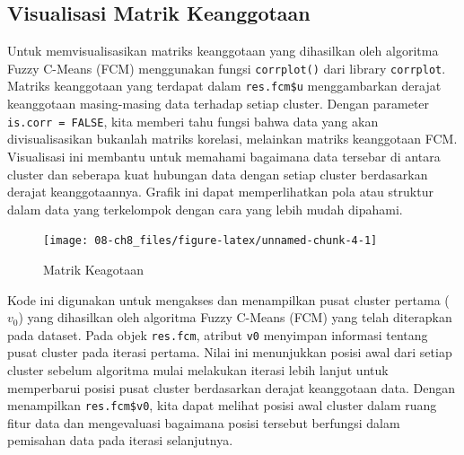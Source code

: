 \documentclass[
  oneside]{book}
\newenvironment{Shaded}{\begin{snugshade}}{\end{snugshade}}
\newcommand{\AttributeTok}[1]{\textcolor[rgb]{0.13,0.29,0.53}{#1}}
\newcommand{\CommentTok}[1]{\textcolor[rgb]{0.56,0.35,0.01}{\textit{#1}}}
\newcommand{\ConstantTok}[1]{\textcolor[rgb]{0.56,0.35,0.01}{#1}}
\newcommand{\FunctionTok}[1]{\textcolor[rgb]{0.13,0.29,0.53}{\textbf{#1}}}
\newcommand{\NormalTok}[1]{#1}
\newcommand{\SpecialCharTok}[1]{\textcolor[rgb]{0.81,0.36,0.00}{\textbf{#1}}}
\begin{document}
\subsection*{Visualisasi Matrik Keanggotaan}\label{visualisasi-matrik-keanggotaan}

Untuk memvisualisasikan matriks keanggotaan yang dihasilkan oleh algoritma Fuzzy C-Means (FCM) menggunakan fungsi \texttt{corrplot()} dari library \texttt{corrplot}. Matriks keanggotaan yang terdapat dalam \texttt{res.fcm\$u} menggambarkan derajat keanggotaan masing-masing data terhadap setiap cluster. Dengan parameter \texttt{is.corr\ =\ FALSE}, kita memberi tahu fungsi bahwa data yang akan divisualisasikan bukanlah matriks korelasi, melainkan matriks keanggotaan FCM. Visualisasi ini membantu untuk memahami bagaimana data tersebar di antara cluster dan seberapa kuat hubungan data dengan setiap cluster berdasarkan derajat keanggotaannya. Grafik ini dapat memperlihatkan pola atau struktur dalam data yang terkelompok dengan cara yang lebih mudah dipahami.

\begin{Shaded}
\end{Shaded}

\begin{figure}[h]

{\centering \texttt{[image: 08-ch8\_files/figure-latex/unnamed-chunk-4-1]} 

}

\caption{Matrik Keagotaan}\label{fig:unnamed-chunk-4}
\end{figure}

Kode ini digunakan untuk mengakses dan menampilkan pusat cluster pertama (\(v_0\)) yang dihasilkan oleh algoritma Fuzzy C-Means (FCM) yang telah diterapkan pada dataset. Pada objek \texttt{res.fcm}, atribut \texttt{v0} menyimpan informasi tentang pusat cluster pada iterasi pertama. Nilai ini menunjukkan posisi awal dari setiap cluster sebelum algoritma mulai melakukan iterasi lebih lanjut untuk memperbarui posisi pusat cluster berdasarkan derajat keanggotaan data. Dengan menampilkan \texttt{res.fcm\$v0}, kita dapat melihat posisi awal cluster dalam ruang fitur data dan mengevaluasi bagaimana posisi tersebut berfungsi dalam pemisahan data pada iterasi selanjutnya.
\end{document}

